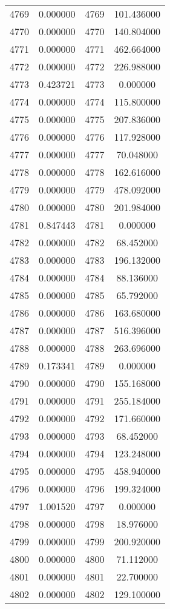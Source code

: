 \documentclass[12pt]{article}
\begin{document}
\begin{longtable}{@{}cccc@{}}
4769 & 0.000000 & 4769 & 101.436000 \\
4770 & 0.000000 & 4770 & 140.804000 \\
4771 & 0.000000 & 4771 & 462.664000 \\
4772 & 0.000000 & 4772 & 226.988000 \\
4773 & 0.423721 & 4773 & 0.000000 \\
4774 & 0.000000 & 4774 & 115.800000 \\
4775 & 0.000000 & 4775 & 207.836000 \\
4776 & 0.000000 & 4776 & 117.928000 \\
4777 & 0.000000 & 4777 & 70.048000 \\
4778 & 0.000000 & 4778 & 162.616000 \\
4779 & 0.000000 & 4779 & 478.092000 \\
4780 & 0.000000 & 4780 & 201.984000 \\
4781 & 0.847443 & 4781 & 0.000000 \\
4782 & 0.000000 & 4782 & 68.452000 \\
4783 & 0.000000 & 4783 & 196.132000 \\
4784 & 0.000000 & 4784 & 88.136000 \\
4785 & 0.000000 & 4785 & 65.792000 \\
4786 & 0.000000 & 4786 & 163.680000 \\
4787 & 0.000000 & 4787 & 516.396000 \\
4788 & 0.000000 & 4788 & 263.696000 \\
4789 & 0.173341 & 4789 & 0.000000 \\
4790 & 0.000000 & 4790 & 155.168000 \\
4791 & 0.000000 & 4791 & 255.184000 \\
4792 & 0.000000 & 4792 & 171.660000 \\
4793 & 0.000000 & 4793 & 68.452000 \\
4794 & 0.000000 & 4794 & 123.248000 \\
4795 & 0.000000 & 4795 & 458.940000 \\
4796 & 0.000000 & 4796 & 199.324000 \\
4797 & 1.001520 & 4797 & 0.000000 \\
4798 & 0.000000 & 4798 & 18.976000 \\
4799 & 0.000000 & 4799 & 200.920000 \\
4800 & 0.000000 & 4800 & 71.112000 \\
4801 & 0.000000 & 4801 & 22.700000 \\
4802 & 0.000000 & 4802 & 129.100000 \\

\end{longtable}
\end{document}
